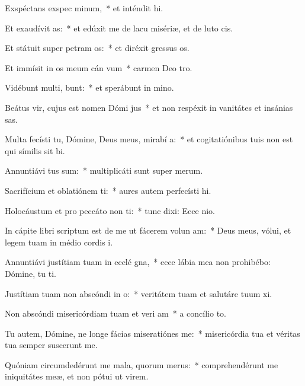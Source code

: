 \item Exspéctans exspec minum,~* et inténdit hi.
\item Et exaudívit  as:~* et edúxit me de lacu misériæ, et de luto cis.
\item Et státuit super petram  os:~* et diréxit gressus os.
\item Et immísit in os meum cán vum~* carmen Deo tro.
\item Vidébunt multi,  bunt:~* et sperábunt in mino.
\item Beátus vir, cujus est nomen Dómi  jus~* et non respéxit in vanitátes et insánias sas.
\item Multa fecísti tu, Dómine, Deus meus, mirabí a:~* et cogitatiónibus tuis non est qui símilis sit bi.
\item Annuntiávi  tus sum:~* multiplicáti sunt super merum.
\item Sacrifícium et oblatiónem ti:~* aures autem perfecísti hi.
\item Holocáustum et pro peccáto non ti:~* tunc dixi: Ecce nio.
\item In cápite libri scriptum est de me ut fácerem volun am:~* Deus meus, vólui, et legem tuam in médio cordis i.
\item Annuntiávi justítiam tuam in ecclé gna,~* ecce lábia mea non prohibébo: Dómine, tu ti.
\item Justítiam tuam non abscóndi in  o:~* veritátem tuam et salutáre tuum xi.
\item Non abscóndi misericórdiam tuam et veri am~* a concílio to.
\item Tu autem, Dómine, ne longe fácias miseratiónes   me:~* misericórdia tua et véritas tua semper suscerunt me.
\item Quóniam circumdedérunt me mala, quorum   merus:~* comprehendérunt me iniquitátes meæ, et non pótui ut virem.
